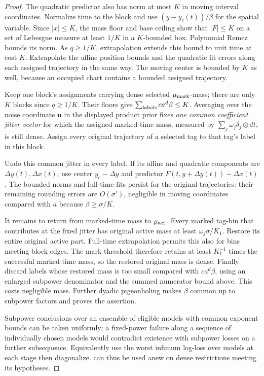 \begin{proof}
The quadratic predictor also has norm at most \(K\) in moving
interval coordinates.  Normalize time to the block and use
\((y-y_c(t))/\beta\) for the spatial variable.  Since
\(|x|\le K\), the mass floor and base ceiling show that
\(|F|\le K\) on a set of Lebesgue measure at least \(1/K\)
in a \(K\)-bounded box.  Polynomial Remez bounds its norm.
As \(q\ge1/K\), extrapolation extends this bound to unit time
at cost \(K\).  Extrapolate the affine position bounds and the
quadratic fit errors along each assigned trajectory in the same way.
The moving center is bounded by \(K\) as well, because an occupied
chart contains a bounded assigned trajectory.

Keep one block's assignments carrying dense selected
\(\mu_{\rm mark}\)-mass; there are only \(K\) blocks since
\(q\ge1/K\). Their floors give
\(\sum_{\rm labels}ca^d\beta\le K\). Averaging over the noise
coordinate \(\mathbf u\) in the displayed product prior fixes
\emph{one common coefficient jitter vector} for which the assigned
marked-time mass, measured by \(\sum_j\omega_j\delta_j\otimes dt\),
is still dense. Assign every original trajectory of a selected tag
to that tag's label in this block.

Undo this common jitter in every label. If its affine and quadratic
components are \(\Delta y(t),\Delta x(t)\), use center
\(y_c-\Delta y\) and predictor
\(F(t,y+\Delta y(t))-\Delta x(t)\). The bounded norms and
full-time fits persist for the original trajectories: their remaining
rounding errors are \(O(\sigma')\), negligible in moving coordinates
compared with \(a\) because \(\beta\ge\sigma/K\).

It remains to return from marked-time mass to \(\mu_{\rm act}\).
Every marked tag-bin that contributes at the fixed jitter has
original active mass at least \(\omega_j\sigma/K_1\). Restore its
entire original active part. Full-time extrapolation permits this
also for bins meeting block edges. The mark threshold therefore
retains at least \(K_1^{-1}\) times the successful marked-time
mass, so the restored original mass is dense. Finally discard
labels whose restored mass is too small compared with
\(ca^d\beta\), using an enlarged subpower denominator and the
summed numerator bound above. This costs negligible mass. Further
dyadic pigeonholing makes \(\beta\) common up to subpower factors
and proves the assertion.

Subpower conclusions over an ensemble of eligible models with common exponent bounds can be taken uniformly: a fixed-power failure along a sequence of individually chosen models would contradict existence with subpower losses on a further subsequence. Equivalently use the worst infimum log-loss over models at each stage then diagonalize.  can thus be used anew on dense restrictions meeting its hypotheses.
\end{proof}
